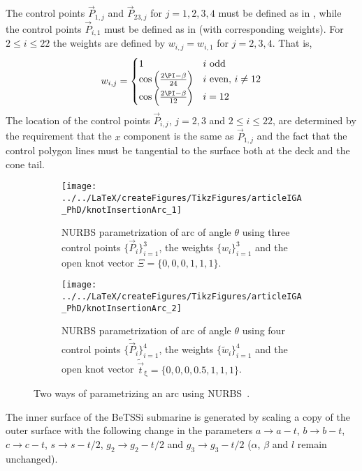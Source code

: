 The control points $\vec{P}_{1,j}$ and $\vec{P}_{23,j}$ for $j=1,2,3,4$ must be defined as in , while the control points $\vec{P}_{i,1}$ must be defined as in  (with corresponding weights). For $2\leq i\leq 22$ the weights are defined by $w_{i,j}=w_{i,1}$ for $j=2,3,4$. That is,
\begin{equation}
	w_{i,j} = \begin{cases}
		1 & i\,\, \text{odd}\\
		\cos\left(\frac{2\PI-\beta}{24}\right) & i\,\, \text{even},\,i\neq 12\\
		\cos\left(\frac{2\PI-\beta}{12}\right) &  i = 12
		\end{cases}		
\end{equation}
The location of the control points $\vec{P}_{i,j}$, $j=2,3$ and $2\leq i\leq 22$, are determined by the requirement that the $x$ component is the same as $\vec{P}_{1,j}$ and the fact that the control polygon lines must be tangential to the surface both at the deck and the cone tail.
\begin{figure}
	\centering    
	\begin{subfigure}[t]{0.44\textwidth}
		\centering
		\texttt{[image: ../../LaTeX/createFigures/TikzFigures/articleIGA\_PhD/knotInsertionArc\_1]}
		\caption{NURBS parametrization of arc of angle $\theta$ using three control points $\{\vec{P}_i\}_{i=1}^3$, the weights $\{w_i\}_{i=1}^3$ and the open knot vector $\Xi=\{0,0,0,1,1,1\}$.}
		\label{Fig2:arcParam1}
	\end{subfigure}%
	\hspace*{0.02\textwidth}%
	\begin{subfigure}[t]{0.54\textwidth}
		\centering
		\texttt{[image: ../../LaTeX/createFigures/TikzFigures/articleIGA\_PhD/knotInsertionArc\_2]}
		\caption{NURBS parametrization of arc of angle $\theta$ using four control points $\{\tilde{\vec{P}}_i\}_{i=1}^4$, the weights $\{\tilde{w}_i\}_{i=1}^4$ and the open knot vector $\tilde{\vec{t}}_\upxi=\{0,0,0,0.5,1,1,1\}$.}
		\label{Fig2:arcParam2}
	\end{subfigure}%
	\caption{Two ways of parametrizing an arc using NURBS~\cite[p. 315]{Piegl1997tnb}.}
\end{figure}

The inner surface of the BeTSSi submarine is generated by scaling a copy of the outer surface with the following change in the parameters $a\to a-t$, $b\to b-t$, $c\to c-t$, $s\to s-t/2$,  $g_2\to g_2-t/2$ and $g_3\to g_3-t/2$ ($\alpha$, $\beta$ and $l$ remain unchanged).